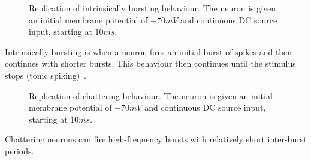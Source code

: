 \documentclass[12pt]{scrreprt}
\begin{document}
\begin{figure}[H]
\centering
{}
\caption{Replication of intrinsically bursting behaviour.
The neuron is given an initial membrane potential of $-70mV$ and continuous DC source input, starting at $10ms$.}
\label{fig:IB}
\end{figure} 
Intrinsically bursting is when a neuron fires an initial burst of spikes and then continues with shorter bursts. 
This behaviour then continues until the stimulus stops (tonic spiking)~\cite{Izhikevich:2006}.

\begin{figure}[H]
\centering
{}
\caption{Replication of chattering behaviour.
The neuron is given an initial membrane potential of $-70mV$ and continuous DC source input, starting at $10ms$.}
\label{fig:CH}
\end{figure} 
Chattering neurons can fire high-frequency bursts with relatively short inter-burst periods. 
\end{document}
